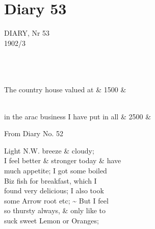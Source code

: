 \documentclass{report}
\begin{document}
\newcommand{\mnote}[1] {\marginpar{\scriptsize \raggedright #1 }}


	\chapter{Diary 53\ \\}

	\marginpar{}

	\par{
 	DIARY, Nr 53\ \\1902/3\ \\\ \\
	}

	\begin{tabular}{|c|c|c|c|c|}
	\hline
	
	\hline
	\end{tabular}

	\\
The country house valued at
	&
1500
	&

	\\
in the arac business I have put in all
	&
2500
	&
\ \\




	\par{
 	From Diary No. 52\ \\
	}

	\par{
 	Light N.W. breeze \& cloudy;\ \\I feel better \& stronger today \& have\ \\much appetite; I got some boiled\ \\Biz fish for breakfast, which I\ \\found very delicious; I also took\ \\some Arrow root etc; \~{} But I feel\ \\so thursty always, \& only like to\ \\suck sweet Lemon or Oranges;\ \\
	}
\end{document}
